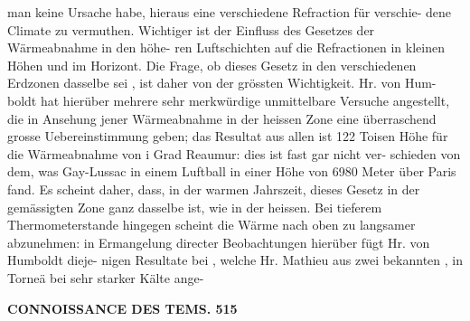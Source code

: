 \documentclass[12pt,a4paper]{article}
\begin{document}
 man  keine  Ursache  habe,  hieraus  eine  verschiedene  Refraction  für  verschie- dene Climate  zu  vermuthen.  Wichtiger  ist  der  Einfluss  des  Gesetzes  der  Wärmeabnahme  in  den  höhe- ren Luftschichten  auf  die  Refractionen  in  kleinen  Höhen  und  im  Horizont.  Die  Frage,  ob  dieses  Gesetz in  den  verschiedenen  Erdzonen  dasselbe  sei ,  ist  daher  von  der  grössten  Wichtigkeit.  Hr.  von  Hum- boldt hat  hierüber  mehrere  sehr  merkwürdige  unmittelbare  Versuche  angestellt,  die  in  Ansehung  jener Wärmeabnahme  in  der  heissen  Zone  eine  überraschend  grosse  Uebereinstimmung  geben;  das  Resultat  aus allen  ist  122  Toisen  Höhe  für  die  Wärmeabnahme  von  i  Grad  Reaumur:  dies  ist  fast  gar  nicht  ver- schieden von  dem,  was  Gay-Lussac  in  einem  Luftball  in  einer  Höhe  von  6980  Meter  über  Paris  fand. Es  scheint  daher,  dass,  in  der  warmen  Jahrszeit,  dieses  Gesetz  in  der  gemässigten  Zone  ganz  dasselbe ist,  wie  in  der  heissen.  Bei  tieferem  Thermometerstande  hingegen  scheint  die  Wärme  nach  oben  zu langsamer  abzunehmen:  in  Ermangelung  directer  Beobachtungen  hierüber  fügt  Hr.  von  Humboldt  dieje- nigen Resultate  bei ,  welche  Hr.  Mathieu  aus  zwei  bekannten ,   in  Torneä   bei  sehr  starker  Kälte  ange-

\vspace{0.5em}


\noindent\textbf{CONNOISSANCE  DES  TEMS.  515}
\end{document}
